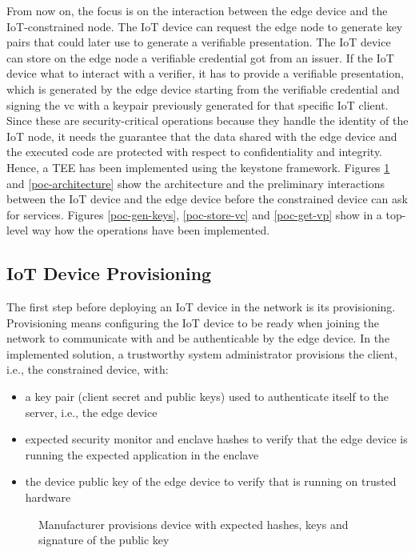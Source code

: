 From now on, the focus is on the interaction between the edge device and the IoT-constrained node. The IoT device can request the edge node to generate key pairs that could later use to generate a verifiable presentation. The IoT device can store on the edge node a verifiable credential got from an issuer. If the IoT device what to interact with a verifier, it has to provide a verifiable presentation, which is generated by the edge device starting from the verifiable credential and signing the vc with a keypair previously generated for that specific IoT client. 
Since these are security-critical operations because they handle the identity of the IoT node, it needs the guarantee that the data shared with the edge device and the executed code are protected with respect to confidentiality and integrity. Hence, a TEE has been implemented using the keystone framework.  Figures \ref{manufacturer-provisioning} and \ref{poc-architecture} show the architecture and the preliminary interactions between the IoT device and the edge device before the constrained device can ask for services. Figures \ref{poc-gen-keys}, \ref{poc-store-vc} and \ref{poc-get-vp} show in a top-level way how the operations have been implemented. 

\subsection{IoT Device Provisioning}

The first step before deploying an IoT device in the network is its provisioning. Provisioning means configuring the IoT device to be ready when joining the network to communicate with and be authenticable by the edge device. In the implemented solution, a trustworthy system administrator provisions the client, i.e., the constrained device, with: 
\begin{itemize}
    \item a key pair (client secret and public keys) used to authenticate itself to the server, i.e., the edge device
    \item expected security monitor and enclave hashes to verify that the edge device is running the expected application in the enclave 
    \item the device public key of the edge device to verify that is running on trusted hardware
\end{itemize} 

\begin{figure}[!h]
    \centering
    
    \caption{Manufacturer provisions device with expected hashes, keys and signature of the public key}
    \label{manufacturer-provisioning}
\end{figure}

